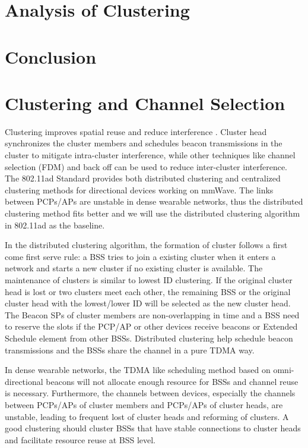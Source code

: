 \documentclass[10pt, conference, letterpaper]{IEEEtran}
\begin{document}
\section{Analysis of Clustering}\label{section:clusteranalysis}
\section{Conclusion}\label{section:conclusion}

\newpage


\section{Clustering and Channel Selection}
Clustering improves spatial reuse and reduce interference \cite{80211ad}. Cluster head synchronizes the cluster members and schedules beacon transmissions in the cluster to mitigate intra-cluster interference, while other techniques like channel selection (FDM) and back off \cite{backoff} can be used to reduce inter-cluster interference. The 802.11ad Standard provides both distributed clustering and centralized clustering methods for directional devices working on mmWave. The links between PCPs/APs are unstable in dense wearable networks, thus the distributed clustering method fits better and we will use the distributed clustering algorithm in 802.11ad as the baseline.

In the distributed clustering algorithm, the formation of cluster follows a first come first serve rule: a BSS tries to join a existing cluster when it enters a network and starts a new cluster if no existing cluster is available. The maintenance of clusters is similar to lowest ID clustering. If the original cluster head is lost or two clusters meet each other, the remaining BSS or the original cluster head with the lowest/lower ID will be selected as the new cluster head. The Beacon SPs of cluster members are non-overlapping in time and a BSS need to reserve the slots if the PCP/AP or other devices receive beacons or Extended Schedule element from other BSSs. Distributed clustering help schedule beacon transmissions and the BSSs share the channel in a pure TDMA way. 

In dense wearable networks, the TDMA like scheduling method based on omni-directional beacons will not allocate enough resource for BSSs and channel reuse is necessary. Furthermore, the channels between devices, especially the channels between PCPs/APs of cluster members and PCPs/APs of cluster heads, are unstable, leading to frequent lost of cluster heads and reforming of clusters. A good clustering should cluster BSSs that have stable connections to cluster heads and facilitate resource reuse at BSS level.
\end{document}
